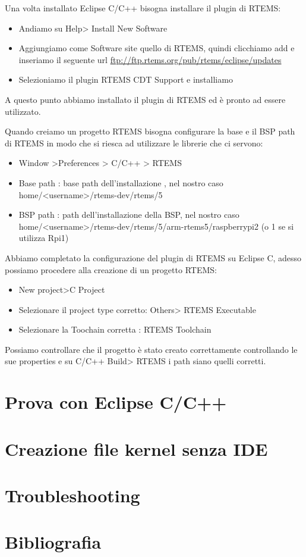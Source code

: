 \documentclass[10pt, a4paper]{article}
\begin{document}
\begin{flushleft}
Una volta installato Eclipse C/C++ bisogna installare il plugin di RTEMS:
\begin{itemize}
\item Andiamo su Help> Install New Software
\item Aggiungiamo come Software site quello di RTEMS, quindi clicchiamo add e inseriamo il seguente url \url{ftp://ftp.rtems.org/pub/rtems/eclipse/updates}
\item Selezioniamo il plugin RTEMS CDT Support e installiamo
\end{itemize}

A questo punto abbiamo installato il plugin di RTEMS ed è pronto ad essere utilizzato.

Quando creiamo un progetto RTEMS bisogna configurare la base e il BSP path di RTEMS in modo che si riesca ad utilizzare le librerie che ci servono:
\begin{itemize}
\item Window >Preferences > C/C++ > RTEMS
\item Base path : base path dell'installazione , nel nostro caso home/<username>/rtems-dev/rtems/5
\item BSP path : path dell'installazione della BSP, nel nostro caso home/<username>/rtems-dev/rtems/5/arm-rtems5/raspberrypi2 (o 1 se si utilizza Rpi1)
\end{itemize}

Abbiamo completato la configurazione del plugin di RTEMS su Eclipse C, adesso possiamo procedere alla creazione di un progetto RTEMS:
\begin{itemize}
\item New project>C Project
\item Selezionare il project type corretto: Others> RTEMS Executable
\item Selezionare la Toochain corretta : RTEMS Toolchain
\end{itemize}

Possiamo controllare che il progetto è stato creato correttamente controllando le sue properties e su C/C++ Build> RTEMS i path siano quelli corretti.

\newpage
\section{Prova con Eclipse C/C++}

\newpage
\section{Creazione file kernel senza IDE}

\newpage
\section{Troubleshooting}

\newpage
\section{Bibliografia}

\end{flushleft}
\end{document}
